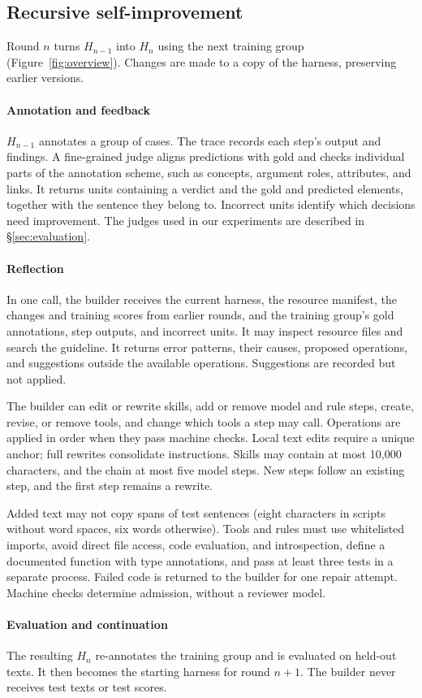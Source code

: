 \subsection{Recursive self-improvement}
\label{sec:rsi}

Round $n$ turns $H_{n-1}$ into $H_n$ using the next training group (Figure~\ref{fig:overview}). Changes are made to a copy of the harness, preserving earlier versions.

\paragraph{Annotation and feedback} $H_{n-1}$ annotates a group of cases. The trace records each step's output and findings. A fine-grained judge aligns predictions with gold and checks individual parts of the annotation scheme, such as concepts, argument roles, attributes, and links. It returns units containing a verdict and the gold and predicted elements, together with the sentence they belong to. Incorrect units identify which decisions need improvement. The judges used in our experiments are described in \S\ref{sec:evaluation}.

\paragraph{Reflection} In one call, the builder receives the current harness, the resource manifest, the changes and training scores from earlier rounds, and the training group's gold annotations, step outputs, and incorrect units. It may inspect resource files and search the guideline. It returns error patterns, their causes, proposed operations, and suggestions outside the available operations. Suggestions are recorded but not applied.

The builder can edit or rewrite skills, add or remove model and rule steps, create, revise, or remove tools, and change which tools a step may call. Operations are applied in order when they pass machine checks. Local text edits require a unique anchor; full rewrites consolidate instructions. Skills may contain at most 10{,}000 characters, and the chain at most five model steps. New steps follow an existing step, and the first step remains a rewrite.

Added text may not copy spans of test sentences (eight characters in scripts without word spaces, six words otherwise). Tools and rules must use whitelisted imports, avoid direct file access, code evaluation, and introspection, define a documented function with type annotations, and pass at least three tests in a separate process. Failed code is returned to the builder for one repair attempt. Machine checks determine admission, without a reviewer model.

\paragraph{Evaluation and continuation} The resulting $H_n$ re-annotates the training group and is evaluated on held-out texts. It then becomes the starting harness for round $n+1$. The builder never receives test texts or test scores.

